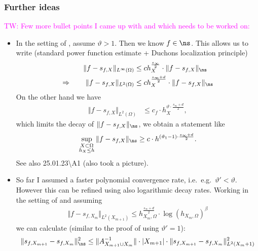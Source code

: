 \documentclass[a4paper, 10pt]{article}
\newcommand{\tw}[1]{\textcolor{magenta}{TW: #1}}
\begin{document}
\subsubsection{Further ideas}

\tw{Few more bullet points I came up with and which needs to be worked on:}

\begin{itemize}
\item In the setting of , assume $\vartheta > 1$.
Then we know $f \in \ns$.
This allows us to write (standard power function estimate + Duchons localization principle)
\begin{align*}
\Vert f - s_{f, X} \Vert_{L^\infty(\Omega)} &\leq c h_X^{\frac{s_\infty}{2}} \cdot \Vert f - s_{f, X} \Vert_{\ns} \\
\Rightarrow \qquad \Vert f - s_{f, X} \Vert_{L^2(\Omega)} &\leq c h_X^{\frac{s_\infty + d}{2}} \cdot \Vert f - s_{f, X} \Vert_{\ns}
\end{align*}
On the other hand we have
\begin{align*}
\Vert f - s_{f, X} \Vert_{L^2(\Omega)} &\leq c_f \cdot h_X^{\vartheta \cdot \frac{s_\infty + d}{2}},
\end{align*}
which limits the decay of $\Vert f - s_{f, X} \Vert_{\ns}$, we obtain a statement like
\begin{align*}
\sup_{\substack{X \subset \Omega \\ h_X \leq h}} \Vert f - s_{f, X} \Vert_{\ns} \geq c \cdot h^{(\vartheta_1 - 1) \cdot \frac{s_\infty + d}{2}}.
\end{align*}
See also 25.01.23\textbackslash A1 (also took a picture).
\item So far I assumed a faster polynomial convergence rate, i.e.\ e.g.\ $\vartheta' < \vartheta$.
However this can be refined using also logarithmic decay rates.
Working in the setting of  and assuming
\begin{align*}
\Vert f - s_{f, X_m} \Vert_{L^2(X_{m+1})} \leq h_{X_m, \Omega}^{\frac{s_\infty + d}{2}} \cdot \log(h_{X_m, \Omega})^\beta
\end{align*}
we can calculate (similar to the proof of  using $\vartheta' = 1$):
\begin{align*}
\Vert s_{f, X_{m+1}} - s_{f, X_m} \Vert_{\ns}^2 &\leq \Vert A_{X_{m+1} \cup X_m}^{-1} \Vert \cdot |X_{m+1}| \cdot \Vert s_{f, X_{m+1}} - s_{f, X_m} \Vert_{L^2(X_m+1)}^2 \\

\end{align*}
\end{itemize}
\end{document}
